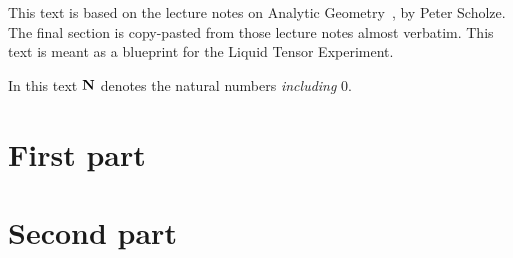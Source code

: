 \maketitle

\begin{remark}
	This text is based on the lecture notes on Analytic Geometry~\cite{Analytic},
	by Peter Scholze.
  The final section is copy-pasted from those lecture notes almost verbatim.
  This text is meant as a blueprint for the Liquid Tensor Experiment.
\end{remark}

\begin{remark}
  In this text $\mathbf{N}$ denotes the natural numbers \emph{including} $0$.
\end{remark}



\section{First part}
\label{cha:one}









\section{Second part}
\label{cha:two}






